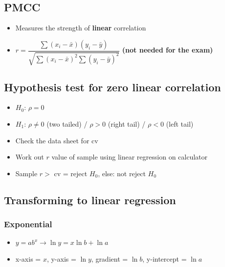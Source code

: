 \documentclass[fleqn, 11pt]{article}
\begin{document}
	\subsection{PMCC}
	\begin{itemize}
		\item Measures the strength of \textbf{linear} correlation
		\item $r =\dfrac{\sum\left(x_{i}-\bar{x}\right)\left(y_{i}-\bar{y}\right)}{\sqrt{\sum\left(x_{i}-\bar{x}\right)^{2} \sum\left(y_{i}-\bar{y}\right)^{2}}}$ \textbf{(not needed for the exam)}
	\end{itemize}
	
	\subsection{Hypothesis test for zero linear correlation}
	\begin{itemize}
		\item $H_0$: $\rho = 0$
		\item $H_1$: $\rho \neq 0$ (two tailed) / $\rho > 0$ (right tail) / $\rho < 0$ (left tail)
		\item Check the data sheet for cv
		\item Work out $r$ value of sample using linear regression on calculator
		\item Sample $r >$ cv = reject $H_0$, else: not reject $H_0$
	\end{itemize}
	
	

	
	

	
	\subsection{Transforming to linear regression}
	\subsubsection{Exponential}
	\begin{itemize}
		\item $y=ab^x\rightarrow\ln y = x\ln b + \ln a$
		\item x-axis = $x$, y-axis = $\ln y$, gradient = $\ln b$, y-intercept = $\ln a$
	\end{itemize}
\end{document}
